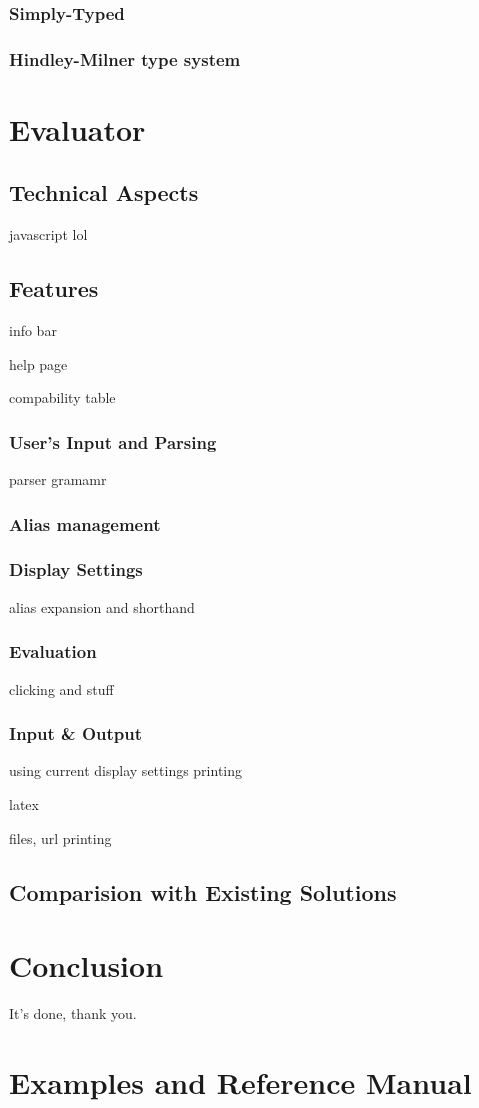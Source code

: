 \documentclass[a4paper,10pt]{article}
\begin{document}
\subsubsection{Simply-Typed }
\subsubsection{Hindley-Milner type system}

\section{Evaluator}
\subsection{Technical Aspects}
javascript lol
\subsection{Features}
info bar

help page


compability table

\subsubsection{User's Input and Parsing}
parser gramamr

\subsubsection{Alias management}

\subsubsection{Display Settings}
alias expansion and shorthand

\subsubsection{Evaluation}
clicking and stuff

\subsubsection{Input \& Output}
using current display settings
printing

latex

files, url
printing

\subsection{Comparision with Existing Solutions}

\section{Conclusion}
It's done, thank you.

\appendix
\section{Examples and Reference Manual}
\end{document}
